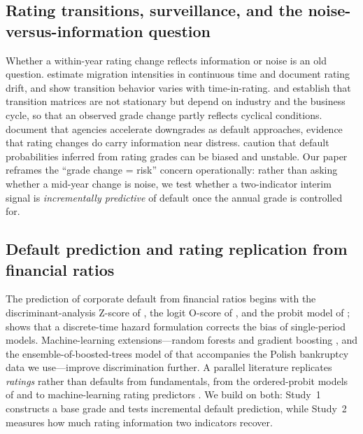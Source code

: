 \documentclass[pdflatex,sn-mathphys-ay]{sn-jnl}
\begin{document}
\subsection{Rating transitions, surveillance, and the noise-versus-information question}
Whether a within-year rating change reflects information or noise is an old question.
\citet{lando2002transitions} estimate migration intensities in continuous time and document
rating drift, and \citet{fledelius2004nonparametric} show transition behavior varies with
time-in-rating. \citet{nickell2000stability} and \citet{bangia2002migration} establish that
transition matrices are not stationary but depend on industry and the business cycle, so that an
observed grade change partly reflects cyclical conditions. \citet{guttler2007adjustment} document
that agencies accelerate downgrades as default approaches, evidence that rating changes do carry
information near distress. \citet{carey2001parameterizing} caution that default probabilities
inferred from rating grades can be biased and unstable. Our paper reframes the ``grade change =
risk'' concern operationally: rather than asking whether a mid-year change is noise, we test
whether a two-indicator interim signal is \emph{incrementally predictive} of default once the
annual grade is controlled for.

\subsection{Default prediction and rating replication from financial ratios}
The prediction of corporate default from financial ratios begins with the discriminant-analysis
Z-score of \citet{altman1968}, the logit O-score of \citet{ohlson1980}, and the probit model of
\citet{zmijewski1984}; \citet{shumway2001} shows that a discrete-time hazard formulation corrects
the bias of single-period models. Machine-learning extensions---random forests and gradient
boosting \citep{barboza2017,jones2017}, and the ensemble-of-boosted-trees model of
\citet{zieba2016} that accompanies the Polish bankruptcy data we use---improve discrimination
further. A parallel literature replicates \emph{ratings} rather than defaults from fundamentals,
from the ordered-probit models of \citet{kaplan1979} and \citet{blume1998} to machine-learning
rating predictors \citep{huang2004,shin1999,kim2012,golbayani2020}. We build on both: Study~1
constructs a base grade and tests incremental default prediction, while Study~2 measures how much
rating information two indicators recover.
\end{document}
